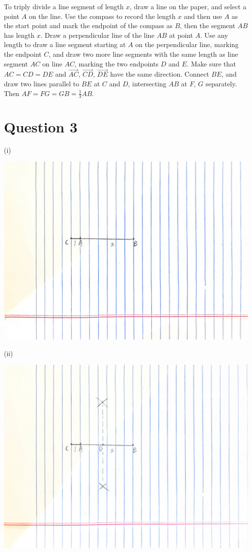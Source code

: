 \documentclass{article}
\begin{document}
To triply divide a line segment of length $x$, draw a line on the paper, and select a point $A$ on the line. Use the compass to record the length $x$ and then use $A$ as the start point and mark the endpoint of the compass as $B$, then the segment $AB$ has length $x$. Draw a perpendicular line of the line $AB$ at point $A$. Use any length to draw a line segment starting at $A$ on the perpendicular line, marking the endpoint $C$, and draw two more line segments with the same length as line segment $AC$ on line $AC$, marking the two endpoints $D$ and $E$. Make sure that $AC=CD=DE$ and $\overrightarrow{AC}$, $\overrightarrow{CD}$, $\overrightarrow{DE}$ have the same direction. Connect $BE$, and draw two lines parallel to $BE$ at $C$ and $D$, intersecting $AB$ at $F$, $G$ separately. Then $AF=FG=GB=\frac{1}{3}AB$.

\newpage

\section*{Question 3}

(i)

\includegraphics[scale=0.05]{HW_0214/3i_1.jpg}

(ii)

\includegraphics[scale=0.05]{HW_0214/3ii_1.jpg}
\end{document}

